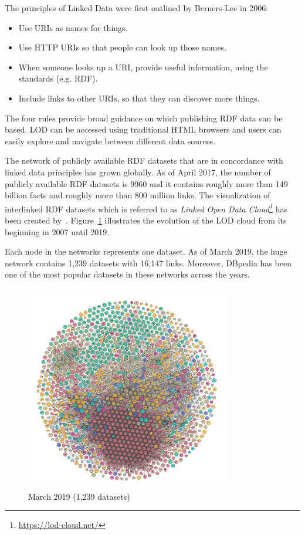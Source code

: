 \noindent The principles of Linked Data were first outlined by Berners-Lee in 2006:
\begin{itemize}
\item Use URIs as names for things.
\item Use HTTP URIs so that people can look up those names.
\item When someone looks up a URI, provide useful information, using the standards (e.g. RDF).
\item Include links to other URIs, so that they can discover more
things.
\end{itemize}
The four rules provide broad guidance on which publishing RDF data can be based. LOD can be accessed using traditional HTML
browsers and users can easily explore and navigate between different data sources.

The network of publicly available RDF datasets that are in concordance with linked data principles has grown globally. As of April 2017, the number of publicly available RDF datasets is 9960 and it contains roughly more than 149 billion facts and roughly more than 800 million links.%
The visualization of interlinked RDF datasets which is referred to as \textit{Linked Open Data Cloud\footnote{\url{https://lod-cloud.net/}}} has been  created by~\citeauthor{LOD_cloud}.  Figure~\ref{fig:lod_cloud} illustrates the evolution of the LOD cloud from its beginning in 2007 until 2019.  

Each node in the networks represents one dataset. As of March 2019, the huge network contains 1,239 datasets with 16,147 links. Moreover, DBpedia has been one of the most popular datasets in these networks across the years. 
\newpage

\vspace{10cm}

%
\clearpage

\begin{figure}[t!]
\centering
\captionsetup{justification=centering,margin=2cm}
 \includegraphics[height=9cm,width=9cm]{Figures/LOD/fig_LOD_2019_clean.png}
 \caption{March 2019 (1,239 datasets)}
 \label{fig:lod_cloud}
\end{figure}


